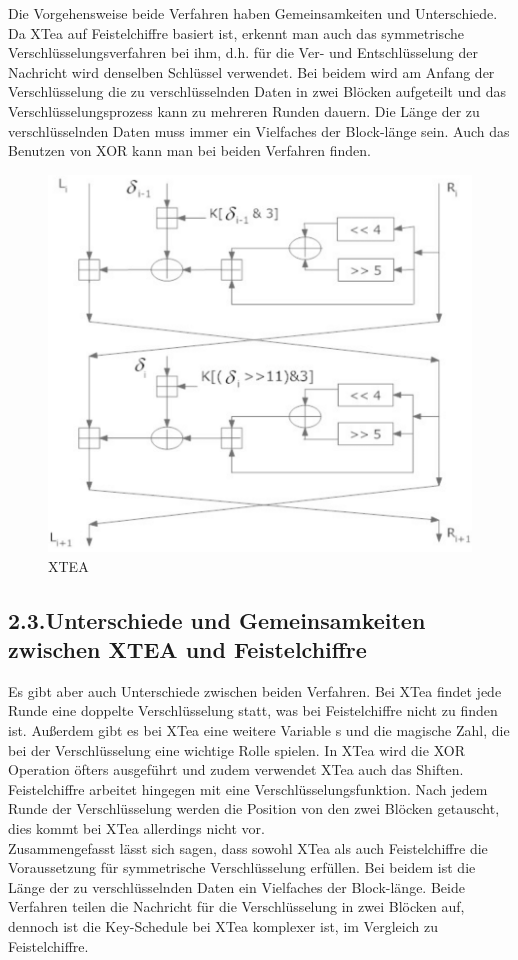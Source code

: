 \documentclass[course=asp]{aspdoc}
\begin{document}
Die Vorgehensweise beide Verfahren haben Gemeinsamkeiten und Unterschiede. Da XTea auf Feistelchiffre basiert ist, erkennt man auch das symmetrische Verschlüsselungsverfahren bei ihm, d.h. für die Ver- und Entschlüsselung der Nachricht wird denselben Schlüssel verwendet. Bei beidem wird am Anfang der Verschlüsselung die zu verschlüsselnden Daten in zwei Blöcken aufgeteilt und das Verschlüsselungsprozess kann zu mehreren Runden dauern. Die Länge der zu verschlüsselnden Daten muss immer ein Vielfaches der Block-länge sein. Auch das Benutzen von XOR kann man bei beiden Verfahren finden. 
\begin{figure}[h]
\centering
\includegraphics[scale = 0.55]{XTEA.png}
\caption{XTEA}
\end{figure}
\newpage




\newpage
\subsection*{2.3.Unterschiede und Gemeinsamkeiten zwischen XTEA und Feistelchiffre}
Es gibt aber auch Unterschiede zwischen beiden Verfahren. Bei XTea findet jede Runde eine doppelte Verschlüsselung statt, was bei Feistelchiffre nicht zu finden ist. Außerdem gibt es bei XTea eine weitere Variable s und die magische Zahl, die bei der Verschlüsselung eine wichtige Rolle spielen. In XTea wird die XOR Operation öfters ausgeführt und zudem verwendet XTea auch das Shiften. Feistelchiffre arbeitet hingegen mit eine Verschlüsselungsfunktion. Nach jedem Runde der Verschlüsselung werden die Position von den zwei Blöcken getauscht, dies kommt bei XTea allerdings nicht vor. \\
Zusammengefasst lässt sich sagen, dass sowohl XTea als auch Feistelchiffre die Voraussetzung für symmetrische Verschlüsselung erfüllen. Bei beidem ist die Länge der zu verschlüsselnden Daten ein Vielfaches der Block-länge. Beide Verfahren teilen die Nachricht für die Verschlüsselung in zwei Blöcken auf, dennoch ist die Key-Schedule bei XTea komplexer ist, im Vergleich zu Feistelchiffre.  
\end{document}
